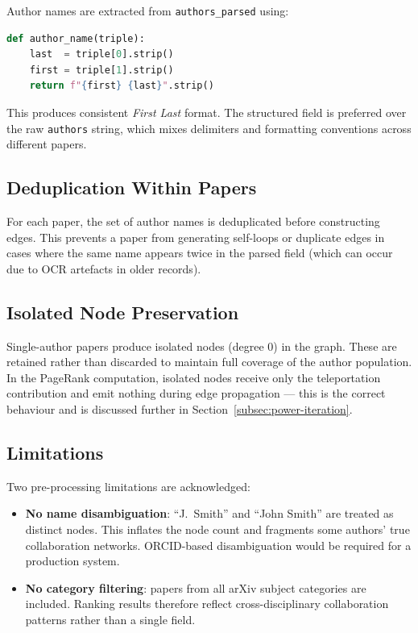 \documentclass[12pt, a4paper]{article}
\begin{document}
Author names are extracted from \texttt{authors\_parsed} using:

\begin{lstlisting}[language=Python]
def author_name(triple):
    last  = triple[0].strip()
    first = triple[1].strip()
    return f"{first} {last}".strip()
\end{lstlisting}

This produces consistent \textit{First Last} format. The structured field is preferred over the raw \texttt{authors} string, which mixes delimiters and formatting conventions across different papers.

\subsection{Deduplication Within Papers}

For each paper, the set of author names is deduplicated before constructing edges. This prevents a paper from generating self-loops or duplicate edges in cases where the same name appears twice in the parsed field (which can occur due to OCR artefacts in older records).

\subsection{Isolated Node Preservation}

Single-author papers produce isolated nodes (degree 0) in the graph. These are retained rather than discarded to maintain full coverage of the author population. In the PageRank computation, isolated nodes receive only the teleportation contribution and emit nothing during edge propagation — this is the correct behaviour and is discussed further in Section~\ref{subsec:power-iteration}.

\subsection{Limitations}

Two pre-processing limitations are acknowledged:

\begin{itemize}
  \item \textbf{No name disambiguation}: ``J.\ Smith'' and ``John Smith'' are treated as distinct nodes. This inflates the node count and fragments some authors' true collaboration networks. ORCID-based disambiguation would be required for a production system.
  \item \textbf{No category filtering}: papers from all arXiv subject categories are included. Ranking results therefore reflect cross-disciplinary collaboration patterns rather than a single field.
\end{itemize}
\end{document}
